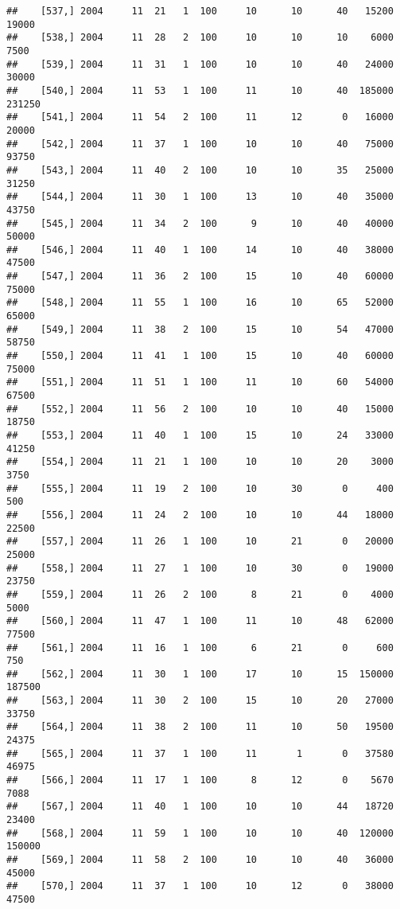 \documentclass{article}\usepackage[]{graphicx}\usepackage[]{color}
\makeatletter
\newenvironment{kframe}{%
 \def\at@end@of@kframe{}%
 \ifinner\ifhmode%
  \def\at@end@of@kframe{\end{minipage}}%
  \begin{minipage}{\columnwidth}%
 \fi\fi%
 \def\FrameCommand##1{\hskip\@totalleftmargin \hskip-\fboxsep
 \colorbox{shadecolor}{##1}\hskip-\fboxsep
     \hskip-\linewidth \hskip-\@totalleftmargin \hskip\columnwidth}%
 \MakeFramed {\advance\hsize-\width
   \@totalleftmargin\z@ \linewidth\hsize
   \@setminipage}}%
 {\par\unskip\endMakeFramed%
 \at@end@of@kframe}
\newenvironment{knitrout}{}{} %
\makeatother
\begin{document}
\begin{knitrout}
\begin{kframe}
\begin{verbatim}
##    [537,] 2004     11  21   1  100     10      10      40   15200   19000
##    [538,] 2004     11  28   2  100     10      10      10    6000    7500
##    [539,] 2004     11  31   1  100     10      10      40   24000   30000
##    [540,] 2004     11  53   1  100     11      10      40  185000  231250
##    [541,] 2004     11  54   2  100     11      12       0   16000   20000
##    [542,] 2004     11  37   1  100     10      10      40   75000   93750
##    [543,] 2004     11  40   2  100     10      10      35   25000   31250
##    [544,] 2004     11  30   1  100     13      10      40   35000   43750
##    [545,] 2004     11  34   2  100      9      10      40   40000   50000
##    [546,] 2004     11  40   1  100     14      10      40   38000   47500
##    [547,] 2004     11  36   2  100     15      10      40   60000   75000
##    [548,] 2004     11  55   1  100     16      10      65   52000   65000
##    [549,] 2004     11  38   2  100     15      10      54   47000   58750
##    [550,] 2004     11  41   1  100     15      10      40   60000   75000
##    [551,] 2004     11  51   1  100     11      10      60   54000   67500
##    [552,] 2004     11  56   2  100     10      10      40   15000   18750
##    [553,] 2004     11  40   1  100     15      10      24   33000   41250
##    [554,] 2004     11  21   1  100     10      10      20    3000    3750
##    [555,] 2004     11  19   2  100     10      30       0     400     500
##    [556,] 2004     11  24   2  100     10      10      44   18000   22500
##    [557,] 2004     11  26   1  100     10      21       0   20000   25000
##    [558,] 2004     11  27   1  100     10      30       0   19000   23750
##    [559,] 2004     11  26   2  100      8      21       0    4000    5000
##    [560,] 2004     11  47   1  100     11      10      48   62000   77500
##    [561,] 2004     11  16   1  100      6      21       0     600     750
##    [562,] 2004     11  30   1  100     17      10      15  150000  187500
##    [563,] 2004     11  30   2  100     15      10      20   27000   33750
##    [564,] 2004     11  38   2  100     11      10      50   19500   24375
##    [565,] 2004     11  37   1  100     11       1       0   37580   46975
##    [566,] 2004     11  17   1  100      8      12       0    5670    7088
##    [567,] 2004     11  40   1  100     10      10      44   18720   23400
##    [568,] 2004     11  59   1  100     10      10      40  120000  150000
##    [569,] 2004     11  58   2  100     10      10      40   36000   45000
##    [570,] 2004     11  37   1  100     10      12       0   38000   47500

\end{verbatim}
\end{kframe}
\end{knitrout}
\end{document}

